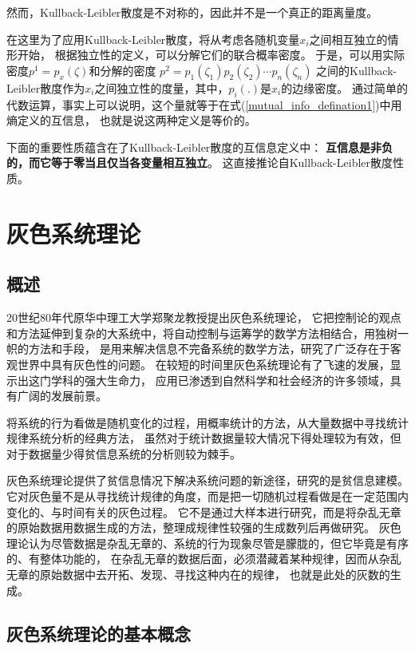 然而，Kullback-Leibler散度是不对称的，因此并不是一个真正的距离量度。

在这里为了应用Kullback-Leibler散度，将从考虑各随机变量$x_i$之间相互独立的情形开始，
根据独立性的定义，可以分解它们的联合概率密度。
于是，可以用实际密度$p^1=p_x(\zeta)$和分解的密度
$p^2=p_1(\zeta_1)p_2(\zeta_2)\cdots p_n(\zeta_n)$
之间的Kullback-Leibler散度作为$x_i$之间独立性的度量，其中，$p_i(.)$是$x_i$的边缘密度。
通过简单的代数运算，事实上可以说明，这个量就等于在式(\ref{mutual_info_defination1})中用熵定义的互信息，
也就是说这两种定义是等价的。

下面的重要性质蕴含在了Kullback-Leibler散度的互信息定义中：
\textbf{互信息是非负的，而它等于零当且仅当各变量相互独立}。
这直接推论自Kullback-Leibler散度性质。
 

\section{灰色系统理论}
\subsection{概述}
20世纪80年代原华中理工大学郑聚龙教授提出灰色系统理论，
它把控制论的观点和方法延伸到复杂的大系统中，将自动控制与运筹学的数学方法相结合，用独树一帜的方法和手段，
是用来解决信息不完备系统的数学方法，研究了广泛存在于客观世界中具有灰色性的问题。
在较短的时间里灰色系统理论有了飞速的发展，显示出这门学科的强大生命力，
应用已渗透到自然科学和社会经济的许多领域，具有广阔的发展前景。

将系统的行为看做是随机变化的过程，用概率统计的方法，从大量数据中寻找统计规律系统分析的经典方法，
虽然对于统计数据量较大情况下得处理较为有效，但对于数据量少得贫信息系统的分析则较为棘手。

灰色系统理论提供了贫信息情况下解决系统问题的新途径，研究的是贫信息建模。
它对灰色量不是从寻找统计规律的角度，而是把一切随机过程看做是在一定范围内变化的、与时间有关的灰色过程。
它不是通过大样本进行研究，而是将杂乱无章的原始数据用数据生成的方法，整理成规律性较强的生成数列后再做研究。
灰色理论认为尽管数据是杂乱无章的、系统的行为现象尽管是朦胧的，但它毕竟是有序的、有整体功能的，
在杂乱无章的数据后面，必须潜藏着某种规律，因而从杂乱无章的原始数据中去开拓、发现、寻找这种内在的规律，
也就是此处的灰数的生成。

\subsection{灰色系统理论的基本概念}
